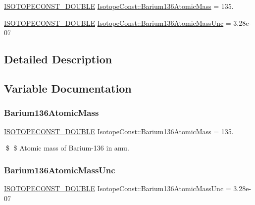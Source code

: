 \begin{DoxyCompactItemize}
\item 
\mbox{\hyperlink{group___isotope_const-_macros_ga8f45a7272ce02c0b4c65c44636ed719a}{I\+S\+O\+T\+O\+P\+E\+C\+O\+N\+S\+T\+\_\+\+D\+O\+U\+B\+LE}} \mbox{\hyperlink{group___isotope_const-_barium-_ba136_gadb2d5e9ac1c822af2e0be28083b21e37}{Isotope\+Const\+::\+Barium136\+Atomic\+Mass}} = 135.
\item 
\mbox{\hyperlink{group___isotope_const-_macros_ga8f45a7272ce02c0b4c65c44636ed719a}{I\+S\+O\+T\+O\+P\+E\+C\+O\+N\+S\+T\+\_\+\+D\+O\+U\+B\+LE}} \mbox{\hyperlink{group___isotope_const-_barium-_ba136_ga70a8fc5953d4bf1210626b5bff506a7f}{Isotope\+Const\+::\+Barium136\+Atomic\+Mass\+Unc}} = 3.\+28e-\/07
\end{DoxyCompactItemize}


\subsection{Detailed Description}


\subsection{Variable Documentation}
\mbox{\label{group___isotope_const-_barium-_ba136_gadb2d5e9ac1c822af2e0be28083b21e37}} 
\subsubsection{\texorpdfstring{Barium136\+Atomic\+Mass}{Barium136AtomicMass}}
{\footnotesize\ttfamily \mbox{\hyperlink{group___isotope_const-_macros_ga8f45a7272ce02c0b4c65c44636ed719a}{I\+S\+O\+T\+O\+P\+E\+C\+O\+N\+S\+T\+\_\+\+D\+O\+U\+B\+LE}} Isotope\+Const\+::\+Barium136\+Atomic\+Mass = 135.}

\$ \$ Atomic mass of Barium-\/136 in amu. \mbox{\label{group___isotope_const-_barium-_ba136_ga70a8fc5953d4bf1210626b5bff506a7f}} 
\subsubsection{\texorpdfstring{Barium136\+Atomic\+Mass\+Unc}{Barium136AtomicMassUnc}}
{\footnotesize\ttfamily \mbox{\hyperlink{group___isotope_const-_macros_ga8f45a7272ce02c0b4c65c44636ed719a}{I\+S\+O\+T\+O\+P\+E\+C\+O\+N\+S\+T\+\_\+\+D\+O\+U\+B\+LE}} Isotope\+Const\+::\+Barium136\+Atomic\+Mass\+Unc = 3.\+28e-\/07}

